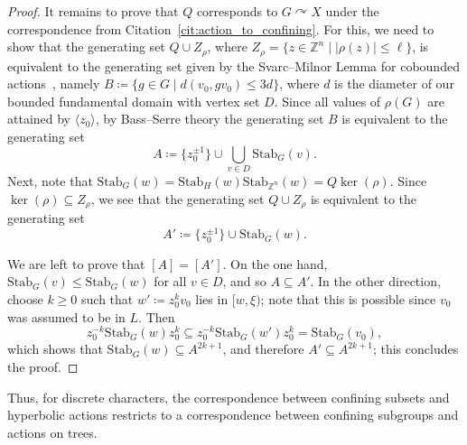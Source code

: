 \documentclass[10pt,a4paper]{article}
\theoremstyle{definition}
\theoremstyle{remark}
\newcommand{\Z}{\mathbb{Z}}
\newcommand{\Stab}{\mathrm{Stab}}
\theoremstyle{plain}
\begin{document}
\begin{proof}
It remains to prove that $Q$ corresponds to $G\curvearrowright X$ under the correspondence from Citation~\ref{cit:action_to_confining}. For this, we need to show that the generating set $Q \cup Z_\rho$, where $Z_\rho = \{ z \in \Z^n \mid |\rho(z)| \leq \ell \}$, is equivalent to the generating set given by the Svarc--Milnor Lemma for cobounded actions~\cite[Lemma 3.11]{ABO}, namely $B \coloneqq \{ g \in G \mid d(v_0, gv_0) \leq 3d \}$, where $d$ is the diameter of our bounded fundamental domain with vertex set $D$. Since all values of $\rho(G)$ are attained by $\langle z_0 \rangle$, by Bass--Serre theory the generating set $B$ is equivalent to the generating set
\[A \coloneqq \{ z_0^{\pm 1} \} \cup \bigcup_{v\in D} \Stab_G(v).\]
Next, note that $\Stab_G(w) = \Stab_H(w) \Stab_{\Z^n}(w) = Q \ker(\rho)$. Since $\ker(\rho) \subseteq Z_\rho$, we see that the generating set $Q \cup Z_\rho$ is equivalent to the generating set
\[A' \coloneqq \{z_0^{\pm 1}\}\cup \Stab_G(w).\]

We are left to prove that $[A] = [A']$. On the one hand, $\Stab_G(v) \leq \Stab_G(w)$ for all $v\in D$, and so $A \subseteq A'$. In the other direction, choose $k \geq 0$ such that $w' \coloneqq z_0^k v_0$ lies in $[w,\xi)$; note that this is possible since $v_0$ was assumed to be in $L$. Then
\[z_0^{-k} \Stab_G(w) z_0^k \subseteq z_0^{-k} \Stab_G(w') z_0^k = \Stab_G(v_0),\]
which shows that $\Stab_G(w) \subseteq A^{2k+1}$, and therefore $A' \subseteq A^{2k+1}$; this concludes the proof.
\end{proof}

Thus, for discrete characters, the correspondence between confining subsets and hyperbolic actions restricts to a correspondence between confining subgroups and actions on trees.
\end{document}

